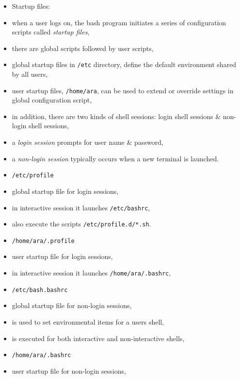 \documentclass[twocolumn]{IEEEtran} %
\begin{document}
\begin{itemize}
  \item Startup files:
    \bi
        \item when a user logs on, the bash program initiates a series of configuration scripts called \emph{startup files},
        \item there are global scripts followed by user scripts,
        \bi
            \item global startup files in \verb|/etc| directory, define the default environment shared by all users,
            \item user startup files, \verb|/home/ara|, can be used to extend or override settings in global configuration script,
        \ei
        \item in addition, there are two kinds of shell sessions: login shell sessions \& non-login shell sessions,
        \bi
            \item a \emph{login session} prompts for user name \& password,
            \item a \emph{non-login session} typically occurs when a new terminal is launched.
        \ei
    \ei
    \item \verb|/etc/profile|
    \bi
        \item global startup file for login sessions,
        \item in interactive session it launches \newline \verb|/etc/bashrc|,
        \item also execute the scripts \newline \verb|/etc/profile.d/*.sh|.
    \ei
    \item \verb|/home/ara/.profile|
    \bi
        \item user startup file for login sessions,
        \item in interactive session it launches \newline \verb|/home/ara/.bashrc|,
    \ei
    \item \verb|/etc/bash.bashrc|
    \bi
    \item global startup file for non-login sessions,
        \item is used to set environmental items for a users shell,
        \item is executed for both interactive and non-interactive shells,
    \ei
    \item \verb|/home/ara/.bashrc|
    \bi
        \item user startup file for non-login sessions,

\end{itemize}
\end{document}
